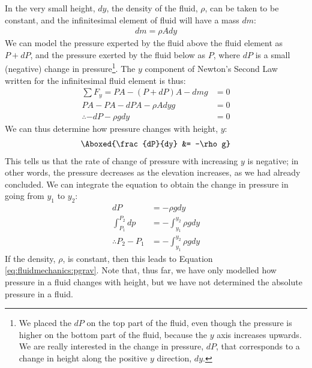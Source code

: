  In the very small height, $dy$, the density of the fluid, $\rho$, can be taken to be constant, and the infinitesimal element of fluid will have a mass $dm$:
\begin{align*}
dm = \rho A dy
\end{align*}
We can model the pressure experted by the fluid above the fluid element as $P+dP$, and the pressure exerted by the fluid below as $P$, where $dP$ is a small (negative) change in pressure\footnote{We placed the $dP$ on the top part of the fluid, even though the pressure is higher on the bottom part of the fluid, because the $y$ axis increases upwards. We are really interested in the change in pressure, $dP$, that corresponds to a change in height along the positive $y$ direction, $dy$. }. The $y$ component of Newton's Second Law written for the infinitesimal fluid element is thus:
\begin{align*}
\sum F_y = PA - (P+dP)A -dm g &=0\\
PA -PA -dPA - \rho A dy g &=0\\
\therefore -dP -\rho gdy &=0
\end{align*}
We can thus determine how pressure changes with height, $y$:
\begin{align}
\Aboxed{\frac{dP}{dy} &= -\rho g}
\end{align}
This tells us that the rate of change of pressure with increasing $y$ is negative; in other words, the pressure decreases as the elevation increases, as we had already concluded. We can integrate the equation to obtain the change in pressure in going from $y_1$ to $y_2$:
\begin{align*}
dP &= -\rho g dy\\
\int_{P_1}^{P_2} dp&=-\int_{y_1}^{y_2}\rho gdy\\
\therefore P_2-P_1 &=-\int_{y_1}^{y_2}\rho gdy
\end{align*}
If the density, $\rho$, is constant, then this leads to Equation \ref{eq:fluidmechanics:pgrav}. Note that, thus far, we have only modelled how pressure in a fluid changes with height, but we have not determined the absolute pressure in a fluid. 

